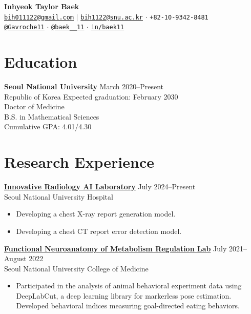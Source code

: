 \documentclass[10pt, a4paper]{article}
\newenvironment{customitemize}
	{\begin{itemize}[leftmargin=*, noitemsep, topsep=0pt, label=$\cdot$]}
	{\end{itemize}}
\begin{document}
\begin{center}
    {\Large\textbf{\color{mycolor}Inhyeok Taylor Baek}} \\[2mm]
    \small
    \faEnvelope\hspace{1mm}\href{mailto:bih011122@gmail.com}{\texttt{bih011122@gmail.com}} $\vert$ \href{mailto:bih1122@snu.ac.kr}{\texttt{bih1122@snu.ac.kr}}
    \hspace{2mm}$\cdot$\hspace{2mm}
    \faPhone\hspace{1mm}\texttt{+82-10-9342-8481} \\[1mm]
    \faGithub\hspace{1mm}\href{https://github.com/gavroche11}{\texttt{@Gavroche11}}
    \hspace{2mm}$\cdot$\hspace{2mm}
    {}\hspace{1mm}\href{https://x.com/baek__11}{\texttt{@baek\_\_11}}
    \hspace{2mm}$\cdot$\hspace{2mm}
    \faLinkedin\hspace{1mm}\href{https://www.linkedin.com/in/baek11/}{\texttt{in/baek11}}
\end{center}

\section*{Education}
\textbf{Seoul National University} \hfill March 2020--Present \\
Republic of Korea \hfill Expected graduation: February 2030 \smallskip\\
Doctor of Medicine\\
B.S. in Mathematical Sciences \smallskip\\
Cumulative GPA: 4.01/4.30

\section*{Research Experience}
\textbf{\href{http://irail.snu.ac.kr}{Innovative Radiology AI Laboratory}} \hfill July 2024--Present\\
Seoul National University Hospital \smallskip
\begin{customitemize}
    \item Developing a chest X-ray report generation model.
    \item Developing a chest CT report error detection model.
\end{customitemize}
\bigskip
\textbf{\href{https://fnmr.snu.ac.kr/}{Functional Neuroanatomy of Metabolism Regulation Lab}} \hfill July 2021--August 2022\\
Seoul National University College of Medicine \smallskip
\begin{customitemize}
    \item Participated in the analysis of animal behavioral experiment data using DeepLabCut, a deep learning library for markerless pose estimation. Developed behavioral indices measuring goal-directed eating behaviors.
\end{customitemize}
\end{document}
